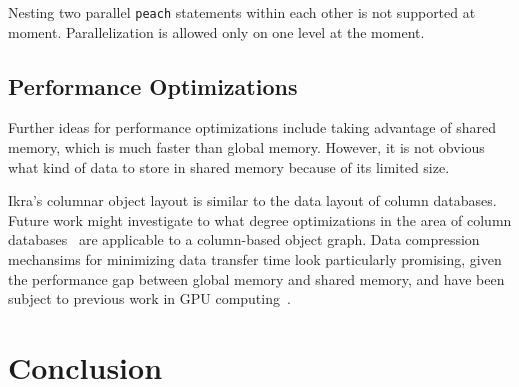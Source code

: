 \documentclass[preprint]{sigplanconf}
\begin{document}
Nesting two parallel \texttt{peach} statements within each other is not supported at moment. Parallelization is allowed only on one level at the moment.

\subsection{Performance Optimizations}
Further ideas for performance optimizations include taking advantage of shared memory, which is much faster than global memory. However, it is not obvious what kind of data to store in shared memory because of its limited size.

Ikra's columnar object layout is similar to the data layout of column databases. Future work might investigate to what degree optimizations in the area of column databases~\cite{DBLP:journals/ftdb/AbadiBHIM13, DBLP:journals/corr/LinMPS16} are applicable to a column-based object graph. Data compression mechansims for minimizing data transfer time look particularly promising, given the performance gap between global memory and shared memory, and have been subject to previous work in GPU computing~\cite{Patel:2012:PLD, Przymus2012}.


\section{Conclusion}




\end{document}
